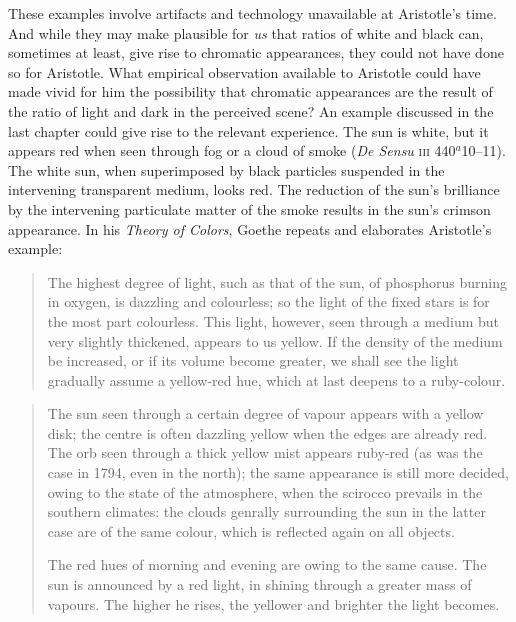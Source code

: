 These examples involve artifacts and technology unavailable at Aristotle's time. And while they may make plausible for \emph{us} that ratios of white and black can, sometimes at least, give rise to chromatic appearances, they could not have done so for Aristotle. What empirical observation available to Aristotle could have made vivid for him the possibility that chromatic appearances are the result of the ratio of light and dark in the perceived scene? An example discussed in the last chapter could give rise to the relevant experience. The sun is white, but it appears red when seen through fog or a cloud of smoke (\emph{De Sensu} \textsc{iii} 440\( ^{a} \)10--11).  The white sun, when superimposed by black particles suspended in the intervening transparent medium, looks red. The reduction of the sun's brilliance by the intervening particulate matter of the smoke results in the sun's crimson appearance. In his \emph{Theory of Colors}, Goethe repeats and elaborates Aristotle's example:
\begin{quote}
	The highest degree of light, such as that of the sun, of phosphorus burning in oxygen, is dazzling and colourless; so the light of the fixed stars is for the most part colourless. This light, however, seen through a medium but very slightly thickened, appears to us yellow. If the density of the medium be increased, or if its volume become greater, we shall see the light gradually assume a yellow-red hue, which at last deepens to a ruby-colour. \citep[\textsc{i} 10 150]{Goethe:1810uq}
\end{quote}
\begin{quotation}
	\noindent The sun seen through a certain degree of vapour appears with a yellow disk; the centre is often dazzling yellow when the edges are already red. The orb seen through a thick yellow mist appears ruby-red (as was the case in 1794, even in the north); the same appearance is still more decided, owing to the state of the atmosphere, when the scirocco prevails in the southern climates: the clouds genrally surrounding the sun in the latter case are of the same colour, which is reflected again on all objects.
	
	The red hues of morning and evening are owing to the same cause. The sun is announced by a red light, in shining through a greater mass of vapours. The higher he rises, the yellower and brighter the light becomes. \citep[\textsc{i} 10 154]{Goethe:1810uq}
\end{quotation}

